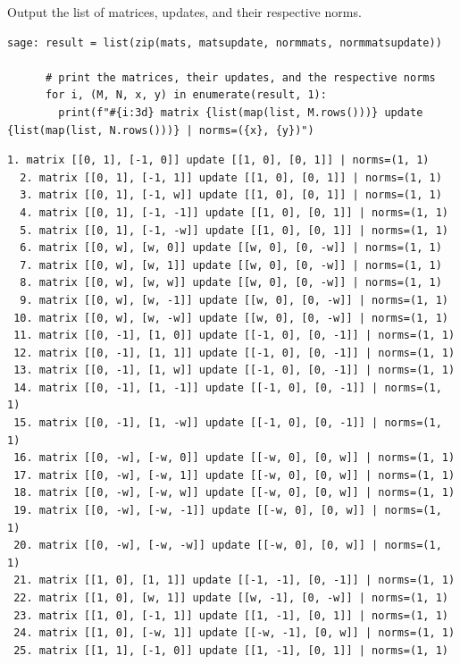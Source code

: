 \documentclass[runningheads]{llncs}
\begin{document}
Output the list of matrices, updates, and their respective norms.
\begin{lstlisting}
sage: result = list(zip(mats, matsupdate, normmats, normmatsupdate))

      # print the matrices, their updates, and the respective norms
      for i, (M, N, x, y) in enumerate(result, 1):
        print(f"#{i:3d} matrix {list(map(list, M.rows()))} update {list(map(list, N.rows()))} | norms=({x}, {y})")
\end{lstlisting}


\begin{lstlisting}[caption={Output candidate matrices, update matrices, and their respective norms.  The claim for \(d=1\) is easily verified from the output norms.}]
  1. matrix [[0, 1], [-1, 0]] update [[1, 0], [0, 1]] | norms=(1, 1)
  2. matrix [[0, 1], [-1, 1]] update [[1, 0], [0, 1]] | norms=(1, 1)
  3. matrix [[0, 1], [-1, w]] update [[1, 0], [0, 1]] | norms=(1, 1)
  4. matrix [[0, 1], [-1, -1]] update [[1, 0], [0, 1]] | norms=(1, 1)
  5. matrix [[0, 1], [-1, -w]] update [[1, 0], [0, 1]] | norms=(1, 1)
  6. matrix [[0, w], [w, 0]] update [[w, 0], [0, -w]] | norms=(1, 1)
  7. matrix [[0, w], [w, 1]] update [[w, 0], [0, -w]] | norms=(1, 1)
  8. matrix [[0, w], [w, w]] update [[w, 0], [0, -w]] | norms=(1, 1)
  9. matrix [[0, w], [w, -1]] update [[w, 0], [0, -w]] | norms=(1, 1)
 10. matrix [[0, w], [w, -w]] update [[w, 0], [0, -w]] | norms=(1, 1)
 11. matrix [[0, -1], [1, 0]] update [[-1, 0], [0, -1]] | norms=(1, 1)
 12. matrix [[0, -1], [1, 1]] update [[-1, 0], [0, -1]] | norms=(1, 1)
 13. matrix [[0, -1], [1, w]] update [[-1, 0], [0, -1]] | norms=(1, 1)
 14. matrix [[0, -1], [1, -1]] update [[-1, 0], [0, -1]] | norms=(1, 1)
 15. matrix [[0, -1], [1, -w]] update [[-1, 0], [0, -1]] | norms=(1, 1)
 16. matrix [[0, -w], [-w, 0]] update [[-w, 0], [0, w]] | norms=(1, 1)
 17. matrix [[0, -w], [-w, 1]] update [[-w, 0], [0, w]] | norms=(1, 1)
 18. matrix [[0, -w], [-w, w]] update [[-w, 0], [0, w]] | norms=(1, 1)
 19. matrix [[0, -w], [-w, -1]] update [[-w, 0], [0, w]] | norms=(1, 1)
 20. matrix [[0, -w], [-w, -w]] update [[-w, 0], [0, w]] | norms=(1, 1)
 21. matrix [[1, 0], [1, 1]] update [[-1, -1], [0, -1]] | norms=(1, 1)
 22. matrix [[1, 0], [w, 1]] update [[w, -1], [0, -w]] | norms=(1, 1)
 23. matrix [[1, 0], [-1, 1]] update [[1, -1], [0, 1]] | norms=(1, 1)
 24. matrix [[1, 0], [-w, 1]] update [[-w, -1], [0, w]] | norms=(1, 1)
 25. matrix [[1, 1], [-1, 0]] update [[1, -1], [0, 1]] | norms=(1, 1)

\end{lstlisting}
\end{document}
